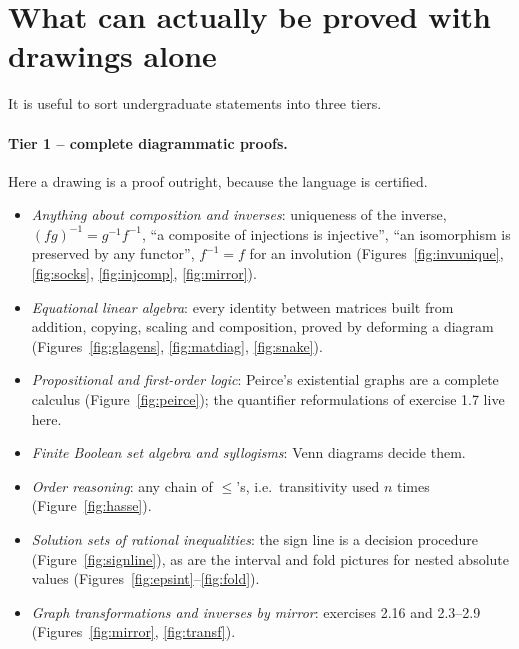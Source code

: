\section{What can actually be proved with drawings alone}
\label{sec:whatprovable}

It is useful to sort undergraduate statements into three tiers.

\paragraph{Tier 1 -- complete diagrammatic proofs.}
Here a drawing is a proof outright, because the language is certified.
\begin{itemize}\itemsep2pt
\item \emph{Anything about composition and inverses}: uniqueness of the inverse,
  $(fg)^{-1}=g^{-1}f^{-1}$, ``a composite of injections is injective'', ``an isomorphism
  is preserved by any functor'', $f^{-1}=f$ for an involution
  (Figures~\ref{fig:invunique}, \ref{fig:socks}, \ref{fig:injcomp}, \ref{fig:mirror}).
\item \emph{Equational linear algebra}: every identity between matrices built from
  addition, copying, scaling and composition, proved by deforming a diagram
  (Figures~\ref{fig:glagens}, \ref{fig:matdiag}, \ref{fig:snake}).
\item \emph{Propositional and first-order logic}: Peirce's existential graphs are a
  complete calculus (Figure~\ref{fig:peirce}); the quantifier reformulations of exercise
  1.7 live here.
\item \emph{Finite Boolean set algebra and syllogisms}: Venn diagrams decide them.
\item \emph{Order reasoning}: any chain of $\le$'s, i.e.\ transitivity used $n$ times
  (Figure~\ref{fig:hasse}).
\item \emph{Solution sets of rational inequalities}: the sign line is a decision
  procedure (Figure~\ref{fig:signline}), as are the interval and fold pictures for nested
  absolute values (Figures~\ref{fig:epsint}--\ref{fig:fold}).
\item \emph{Graph transformations and inverses by mirror}: exercises 2.16 and 2.3--2.9
  (Figures~\ref{fig:mirror}, \ref{fig:transf}).
\end{itemize}

